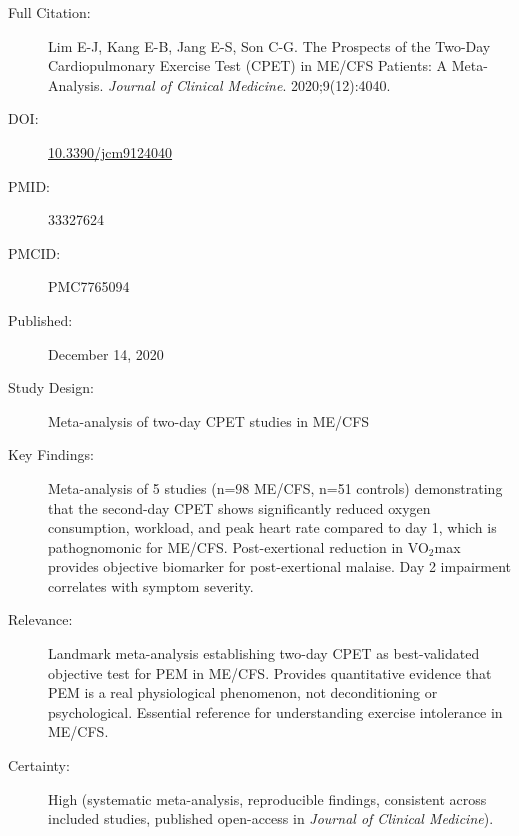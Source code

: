 \begin{description}
    \item[Full Citation:] Lim E-J, Kang E-B, Jang E-S, Son C-G. The Prospects of the Two-Day Cardiopulmonary Exercise Test (CPET) in ME/CFS Patients: A Meta-Analysis. \textit{Journal of Clinical Medicine}. 2020;9(12):4040.
    \item[DOI:] \href{https://doi.org/10.3390/jcm9124040}{10.3390/jcm9124040}
    \item[PMID:] 33327624
    \item[PMCID:] PMC7765094
    \item[Published:] December 14, 2020
    \item[Study Design:] Meta-analysis of two-day CPET studies in ME/CFS
    \item[Key Findings:] Meta-analysis of 5 studies (n=98 ME/CFS, n=51 controls) demonstrating that the second-day CPET shows significantly reduced oxygen consumption, workload, and peak heart rate compared to day 1, which is pathognomonic for ME/CFS. Post-exertional reduction in VO$_2$max provides objective biomarker for post-exertional malaise. Day 2 impairment correlates with symptom severity.
    \item[Relevance:] Landmark meta-analysis establishing two-day CPET as best-validated objective test for PEM in ME/CFS. Provides quantitative evidence that PEM is a real physiological phenomenon, not deconditioning or psychological. Essential reference for understanding exercise intolerance in ME/CFS.
    \item[Certainty:] High (systematic meta-analysis, reproducible findings, consistent across included studies, published open-access in \textit{Journal of Clinical Medicine}).
\end{description}

